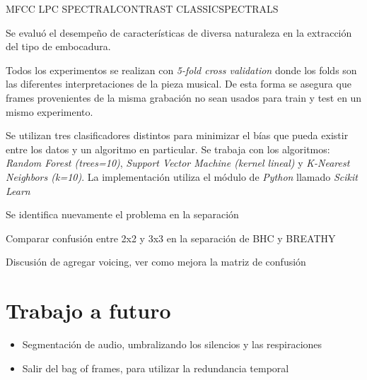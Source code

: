 \documentclass{article}
\begin{document}
MFCC LPC SPECTRALCONTRAST CLASSICSPECTRALS

Se evaluó el desempeño de características de diversa naturaleza en la extracción del tipo de embocadura. 
\medskip

Todos los experimentos se realizan con \textit{5-fold cross validation} donde los folds son las diferentes interpretaciones de la pieza musical. De esta forma se asegura que frames provenientes de la misma grabación no sean usados para train y test en un mismo experimento.
\medskip

Se utilizan tres clasificadores distintos para minimizar el bías que pueda existir entre los datos y un algoritmo en particular. Se trabaja con los algoritmos: \textit{Random Forest (trees=10)}, \textit{Support Vector Machine (kernel lineal)} y \textit{K-Nearest Neighbors (k=10)}. La implementación utiliza el módulo de \textit{Python} llamado \textit{Scikit Learn} \citep{pedregosa2011scikit} 
\medskip

Se identifica nuevamente el problema en la separación

Comparar confusión entre 2x2 y 3x3 en la separación de BHC y BREATHY

Discusión de agregar voicing, ver como mejora la matriz de confusión 

\subsubsection{}


\section{Trabajo a futuro}

\begin{itemize} 
  \item Segmentación de audio, umbralizando los silencios y las respiraciones 
  \item Salir del bag of frames, para utilizar la redundancia temporal
\end{itemize}


\newpage




\end{document}
